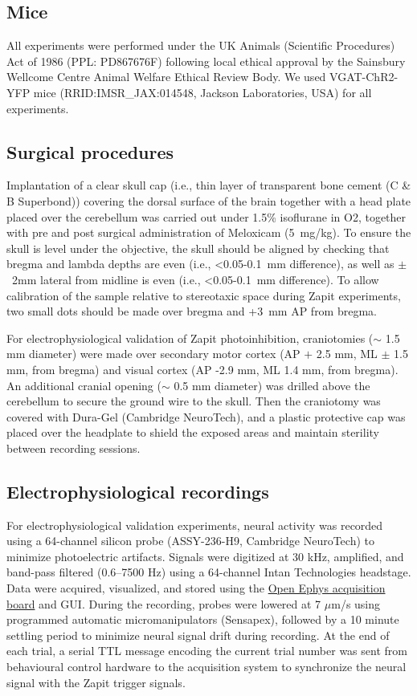 \subsection{Mice}
All experiments were performed under the UK Animals (Scientific Procedures) Act of 1986 (PPL: PD867676F) following local ethical approval by the Sainsbury Wellcome Centre Animal Welfare Ethical Review Body.
We used VGAT-ChR2-YFP mice (RRID:IMSR\_JAX:014548, Jackson Laboratories, USA) for all experiments.

\subsection{Surgical procedures}
Implantation of a clear skull cap (i.e., thin layer of transparent bone cement (C \& B Superbond)) covering the dorsal surface of the brain together with a head plate placed over the cerebellum was carried out under 1.5\% isoflurane in O2, together with pre and post surgical administration of Meloxicam (5~mg/kg).
To ensure the skull is level under the objective, the skull should be aligned by checking that bregma and lambda depths are even (i.e., <0.05-0.1~mm difference), as well as $\pm$~2mm lateral from midline is even (i.e., <0.05-0.1~mm difference).
To allow calibration of the sample relative to stereotaxic space during Zapit experiments, two small dots should be made over bregma and +3~mm AP from bregma.

For electrophysiological validation of Zapit photoinhibition, craniotomies ($\sim$ 1.5 mm diameter) were made over secondary motor cortex  (AP $+$ 2.5 mm, ML $\pm$ 1.5 mm, from bregma) and visual cortex (AP -2.9 mm, ML 1.4 mm, from bregma).
An additional cranial opening ($\sim$ 0.5 mm diameter) was drilled above the cerebellum to secure the ground wire to the skull.
Then the craniotomy was covered with Dura-Gel (Cambridge NeuroTech), and a plastic protective cap was placed over the headplate to shield the exposed areas and maintain sterility between recording sessions.


\subsection{Electrophysiological recordings}

For electrophysiological validation experiments, neural activity was recorded using a 64-channel silicon probe (ASSY-236-H9, Cambridge NeuroTech) to minimize photoelectric artifacts.
Signals were digitized at 30 kHz, amplified, and band-pass filtered (0.6–7500 Hz) using a 64-channel Intan Technologies headstage.
Data were acquired, visualized, and stored using the \href{https://open-ephys.github.io/acq-board-docs/}{Open Ephys acquisition board} and GUI.
During the recording, probes were lowered at 7 $\mu$m/s using programmed automatic micromanipulators (Sensapex), followed by a 10 minute settling period to minimize neural signal drift during recording.
At the end of each trial, a serial TTL message encoding the current trial number was sent from behavioural control hardware to the acquisition system to synchronize the neural signal with the Zapit trigger signals.


